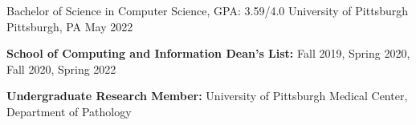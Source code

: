 
\begin{cventries}
    \cventry
    {Bachelor of Science in Computer Science, GPA: 3.59/4.0} %
    {University of Pittsburgh} %
    {Pittsburgh, PA} %
    {May 2022} %
    {
      \begin{cvitems} %
         \item {\textbf{School of Computing and Information Dean's List: }Fall 2019, Spring 2020, Fall 2020, Spring 2022 \entrydatestyle{}}
         \vspace{0.5mm}
         \item {\textbf{Undergraduate Research Member:} University of Pittsburgh Medical Center, Department of Pathology \entrydatestyle{}}
      \end{cvitems}
    }
\end{cventries}
